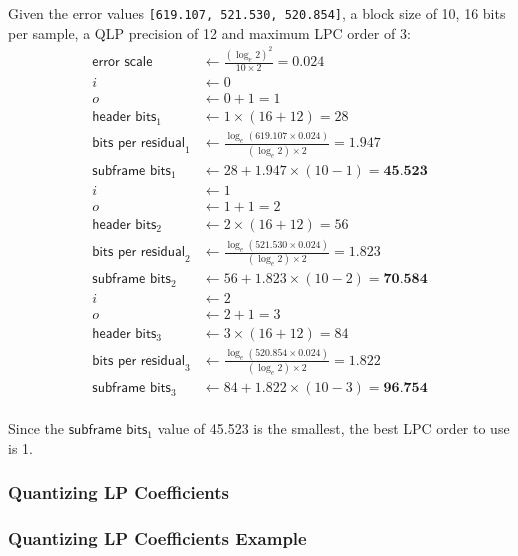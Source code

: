 Given the error values \texttt{[619.107, 521.530, 520.854]},
a block size of 10, 16 bits per sample, a QLP precision of 12 and maximum LPC order of 3:
\begin{align*}
  \textsf{error scale} &\leftarrow \frac{({\log_e 2}) ^ 2}{10 \times 2} = 0.024 \\
  i &\leftarrow 0 \\
  o &\leftarrow 0 + 1 = 1 \\
  \textsf{header bits}_1 &\leftarrow 1 \times (16 + 12) = 28 \\
  \textsf{bits per residual}_1 &\leftarrow \frac{\log_e(619.107 \times 0.024)}{({\log_e 2}) \times 2} = 1.947 \\
  \textsf{subframe bits}_1 &\leftarrow 28 + 1.947 \times (10 - 1) = \textbf{45.523} \\
  i &\leftarrow 1 \\
  o &\leftarrow 1 + 1 = 2 \\
  \textsf{header bits}_2 &\leftarrow 2 \times (16 + 12) = 56 \\
  \textsf{bits per residual}_2 &\leftarrow \frac{\log_e(521.530 \times 0.024)}{({\log_e 2}) \times 2} = 1.823 \\
  \textsf{subframe bits}_2 &\leftarrow 56 + 1.823 \times (10 - 2) = \textbf{70.584} \\
  i &\leftarrow 2 \\
  o &\leftarrow 2 + 1 = 3 \\
  \textsf{header bits}_3 &\leftarrow 3 \times (16 + 12) = 84 \\
  \textsf{bits per residual}_3 &\leftarrow \frac{\log_e(520.854 \times 0.024)}{({\log_e 2}) \times 2} = 1.822 \\
  \textsf{subframe bits}_3 &\leftarrow 84 + 1.822 \times (10 - 3) = \textbf{96.754} \\
\end{align*}
\par
\noindent
Since the $\textsf{subframe bits}_1$ value of 45.523 is the smallest,
the best LPC order to use is 1.

\clearpage

\subsubsection{Quantizing LP Coefficients}
\label{flac:quantize_lp_coeffs}
{
  
}

\clearpage

\subsubsection{Quantizing LP Coefficients Example}

